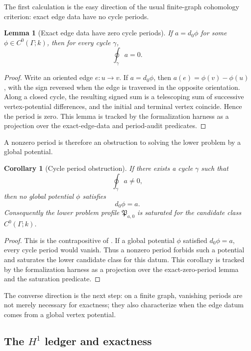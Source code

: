 \documentclass[11pt]{article}
\newtheorem{lemma}[theorem]{Lemma}
\newtheorem{corollary}[theorem]{Corollary}
\theoremstyle{definition}
\begin{document}
The first calculation is the easy direction of the usual finite-graph
cohomology criterion: exact edge data have no cycle periods.

\begin{lemma}[Exact edge data have zero cycle periods]
\label{lem:coh-exact-zero-periods}
If \(a=d_0\phi\) for some \(\phi\in C^0(\Gamma;k)\), then for every cycle \(\gamma\),
\[
\oint_\gamma a=0.
\]
\end{lemma}

\begin{proof}
Write an oriented edge \(e:u\to v\).  If \(a=d_0\phi\), then
\(a(e)=\phi(v)-\phi(u)\), with the sign reversed when the edge is traversed in
the opposite orientation.  Along a closed cycle, the resulting signed sum is a
telescoping sum of successive vertex-potential differences, and the initial and
terminal vertex coincide.  Hence the period is zero.  This lemma is tracked by
the formalization harness as a projection over the exact-edge-data and
period-audit predicates.
\end{proof}

A nonzero period is therefore an obstruction to solving the lower problem by a
global potential.

\begin{corollary}[Cycle period obstruction]
\label{cor:coh-period-obstruction}
If there exists a cycle \(\gamma\) such that
\[
\oint_\gamma a\neq 0,
\]
then no global potential \(\phi\) satisfies
\[
d_0\phi=a.
\]
Consequently the lower problem profile \(\mathfrak P_{a,0}\) is saturated for the candidate class \(C^0(\Gamma;k)\).
\end{corollary}

\begin{proof}
This is the contrapositive of .  If a global
potential \(\phi\) satisfied \(d_0\phi=a\), every cycle period would vanish.
Thus a nonzero period forbids such a potential and saturates the lower candidate
class for this datum.  This corollary is tracked by the formalization harness as
a projection over the exact-zero-period lemma and the saturation predicate.
\end{proof}

The converse direction is the next step: on a finite graph, vanishing periods
are not merely necessary for exactness; they also characterize when the edge
datum comes from a global vertex potential.

\subsection{The \texorpdfstring{\(H^1\)}{H1} ledger and exactness}
\label{subsec:coh-h1-ledger}
\end{document}

